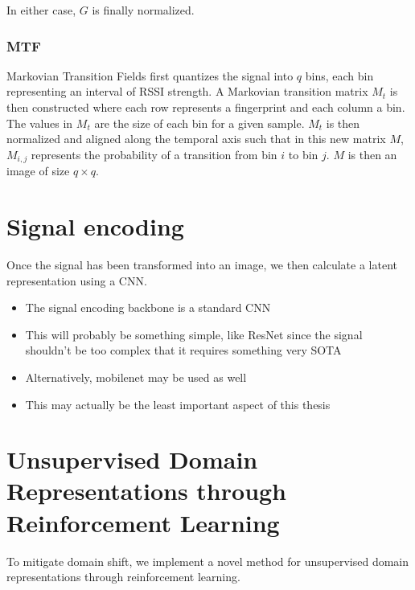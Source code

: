 In either case, $G$ is finally normalized.

\subsubsection{MTF}
Markovian Transition Fields \cite{wang2015imaging} first quantizes the signal into $q$ bins, each bin representing an interval of RSSI strength.
A Markovian transition matrix $M_{t}$ is then constructed where each row represents a fingerprint and each column a bin. 
The values in $M_{t}$ are the size of each bin for a given sample.
$M_{t}$ is then normalized and aligned along the temporal axis such that in this new matrix $M$, $M_{i, j}$ represents the probability of a transition from bin $i$ to bin $j$.
$M$ is then an image of size $q \times q$.

\section{Signal encoding}\label{sec:methodology-signal-encoding}

Once the signal has been transformed into an image, we then calculate a latent representation using a CNN.

\begin{itemize}
	\item The signal encoding backbone is a standard CNN
	\item This will probably be something simple, like ResNet since the signal shouldn't be too complex that it requires something very SOTA
	\item Alternatively, mobilenet may be used as well
	\item This may actually be the least important aspect of this thesis
\end{itemize}

\section{Unsupervised Domain Representations through Reinforcement Learning}

To mitigate domain shift, we implement a novel method for unsupervised domain representations through reinforcement learning.

